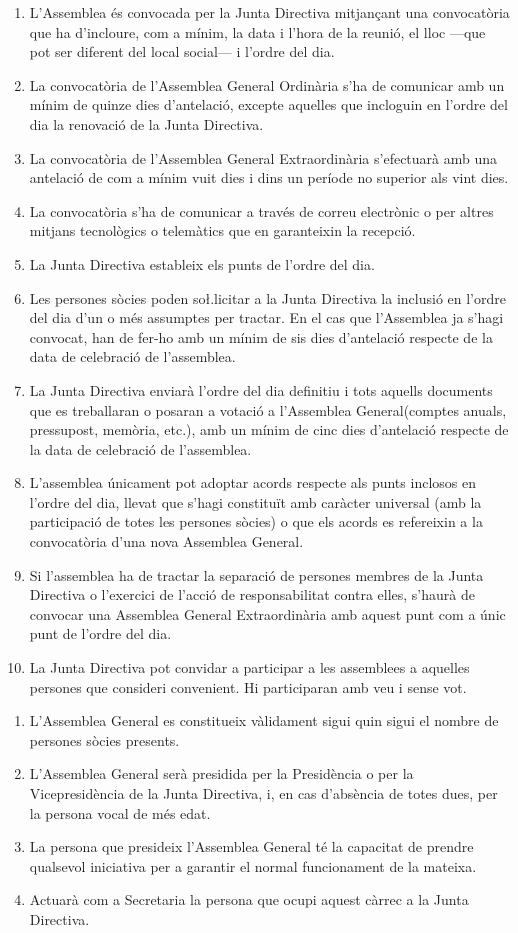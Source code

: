 \documentclass[11pt,a4paper]{article}
\newcommand{\JD}{Junta Directiva\xspace}
\newcommand{\AG}{Assemblea General\xspace}
\newcommand{\AGO}{Assemblea General Ordinària\xspace}
\newcommand{\AGE}{Assemblea General Extraordinària\xspace}
\begin{document}
\begin{enumerate}
    \item L'Assemblea és convocada per la \JD mitjançant una convocatòria que ha d'incloure, com a mínim, la data i l'hora de la reunió, el lloc ---que pot ser diferent del local social--- i l'ordre del dia.
    \item La convocatòria de l'\AGO s'ha de comunicar amb un mínim de quinze dies d'antelació, excepte aquelles que incloguin en l'ordre del dia la renovació de la \JD.
    \item La convocatòria de l'\AGE s'efectuarà amb una antelació de com a mínim vuit dies i dins un període no superior als vint dies.
    \item La convocatòria s'ha de comunicar a través de correu electrònic o per altres mitjans tecnològics o telemàtics que en garanteixin la recepció.
    \item La \JD estableix els punts de l'ordre del dia.
    \item Les persones sòcies poden so\l.licitar a la \JD la inclusió en l'ordre del dia d'un o més assumptes per tractar. En el cas que l'Assemblea ja s'hagi convocat, han de fer-ho amb un mínim de sis dies d'antelació respecte de la data de celebració de l'assemblea.
    \item La \JD enviarà l'ordre del dia definitiu i tots aquells documents que es treballaran o posaran a votació a l'\AG (comptes anuals, pressupost, memòria, etc.), amb un mínim de cinc dies d'antelació respecte de la data de celebració de l'assemblea.
    \item L'assemblea únicament pot adoptar acords respecte als punts inclosos en l'ordre del dia, llevat que s'hagi constituït amb caràcter universal (amb la participació de totes les persones sòcies) o que els acords es refereixin a la convocatòria d'una nova \AG.
    \item Si l'assemblea ha de tractar la separació de persones membres de la \JD o l'exercici de l'acció de responsabilitat contra elles, s'haurà de convocar una \AGE amb aquest punt com a únic punt de l'ordre del dia.
    \item La \JD pot convidar a participar a les assemblees a aquelles persones que consideri convenient. Hi participaran amb veu i sense vot.
\end{enumerate}


\begin{enumerate}
    \item L'\AG es constitueix vàlidament sigui quin sigui el nombre de persones sòcies presents.
    \item L'\AG serà presidida per la Presidència o per la Vicepresidència de la \JD, i, en cas d'absència de totes dues, per la persona vocal de més edat.
    \item La persona que presideix l'\AG té la capacitat de prendre qualsevol iniciativa per a garantir el normal funcionament de la mateixa.
    \item Actuarà com a Secretaria la persona que ocupi aquest càrrec a la \JD.
\end{enumerate}
\end{document}
